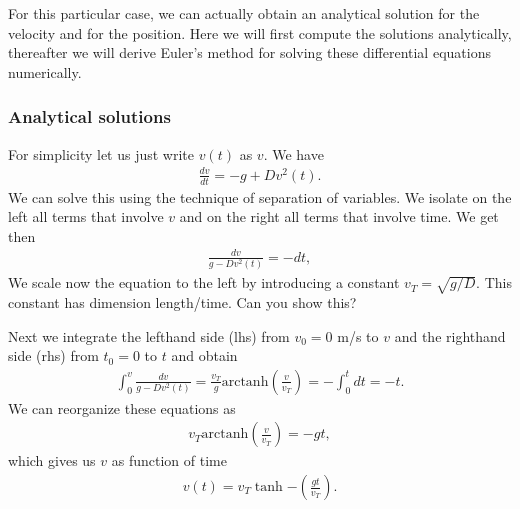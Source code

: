 \documentclass[letterpaper,10pt,english]{sphinxmanual}
\begin{document}
For this particular case, we can actually obtain an analytical
solution for the velocity and for the position. Here we will first
compute the solutions analytically, thereafter we will derive Euler’s
method for solving these differential equations numerically.


\subsubsection{Analytical solutions}
\label{\detokenize{chapter2:analytical-solutions}}
For simplicity let us just write \(v(t)\) as \(v\). We have
\begin{equation*}
\begin{split}
\frac{dv}{dt}= -g +Dv^2(t).
\end{split}
\end{equation*}
We can solve this using the technique of separation of variables. We
isolate on the left all terms that involve \(v\) and on the right all
terms that involve time. We get then
\begin{equation*}
\begin{split}
\frac{dv}{g -Dv^2(t) }= -dt,
\end{split}
\end{equation*}
We scale now the equation to the left by introducing a constant
\(v_T=\sqrt{g/D}\). This constant has dimension length/time. Can you
show this?

Next we integrate the left\sphinxhyphen{}hand side (lhs) from \(v_0=0\) m/s to \(v\) and
the right\sphinxhyphen{}hand side (rhs) from \(t_0=0\) to \(t\) and obtain
\begin{equation*}
\begin{split}
\int_{0}^v\frac{dv}{g -Dv^2(t) }= \frac{v_T}{g}\mathrm{arctanh}(\frac{v}{v_T})  =-\int_0^tdt = -t.
\end{split}
\end{equation*}
We can reorganize these equations as
\begin{equation*}
\begin{split}
v_T\mathrm{arctanh}(\frac{v}{v_T})  =-gt,
\end{split}
\end{equation*}
which gives us \(v\) as function of time
\begin{equation*}
\begin{split}
v(t)=v_T\tanh{-(\frac{gt}{v_T})}.
\end{split}
\end{equation*}
\end{document}
